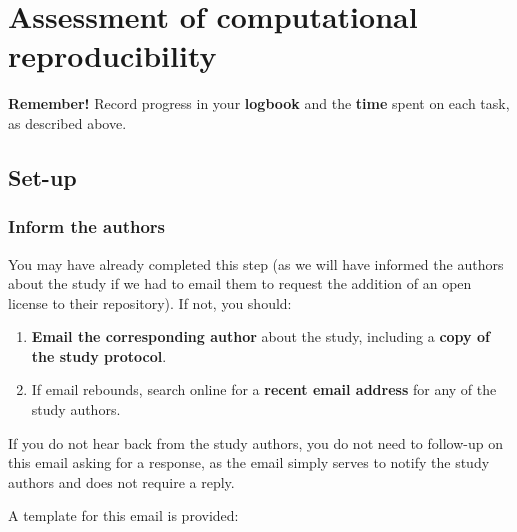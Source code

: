 \section{Assessment of computational reproducibility} \label{sec:reproduce}

\textbf{Remember!} Record progress in your \textbf{logbook} and the \textbf{time} spent on each task, as described above.

\vspace{0.5cm}
\subsection{Set-up}

\subsubsection{Inform the authors}

You may have already completed this step (as we will have informed the authors about the study if we had to email them to request the addition of an open license to their repository). If not, you should:
\begin{enumerate}
    \item \textbf{Email the corresponding author} about the study, including a \textbf{copy of the study protocol}.
    \item If email rebounds, search online for a \textbf{recent email address} for any of the study authors.
\end{enumerate}

If you do not hear back from the study authors, you do not need to follow-up on this email asking for a response, as the email simply serves to notify the study authors and does not require a reply.

A template for this email is provided:

